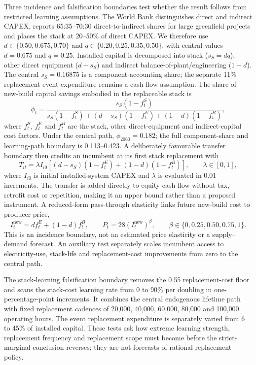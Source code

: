 \documentclass[pdflatex,sn-nature]{sn-jnl}
\begin{document}
Three incidence and falsification boundaries test whether the result follows from restricted learning assumptions. The World Bank distinguishes direct and indirect CAPEX, reports 65:35--70:30 direct-to-indirect shares for large greenfield projects and places the stack at 20--50\% of direct CAPEX\cite{worldbank2026}. We therefore use $d\in\{0.50,0.675,0.70\}$ and $q\in\{0.20,0.25,0.35,0.50\}$, with central values $d=0.675$ and $q=0.25$. Installed capital is decomposed into stack ($s_S=dq$), other direct equipment ($d-s_S$) and indirect balance-of-plant/engineering ($1-d$). The central $s_S=0.16875$ is a component-accounting share; the separate 11\% replacement-event expenditure remains a cash-flow assumption. The share of new-build capital savings embodied in the replaceable stack is
\begin{equation}
\phi_t=\frac{s_S(1-f^S_t)}{s_S(1-f^S_t)+(d-s_S)(1-f^E_t)+(1-d)(1-f^B_t)},
\label{eq:incidence}
\end{equation}
where $f^S_t$, $f^E_t$ and $f^B_t$ are the stack, other direct-equipment and indirect-capital cost factors. Under the central path, $\phi_{2060}=0.182$; the full component-share and learning-path boundary is 0.113--0.423. A deliberately favourable transfer boundary then credits an incumbent at its first stack replacement with
\begin{equation}
T_{it}=\lambda I_{i0}\left[(d-s_S)(1-f^E_t)+(1-d)(1-f^B_t)\right],
\qquad \lambda\in[0,1],
\label{eq:transfer}
\end{equation}
where $I_{i0}$ is initial installed-system CAPEX and $\lambda$ is evaluated in 0.01 increments. The transfer is added directly to equity cash flow without tax, retrofit cost or repetition, making it an upper bound rather than a proposed instrument. A reduced-form pass-through elasticity links future new-build cost to producer price,
\begin{equation}
I_t^{\mathrm{new}}=d f_t^E+(1-d)f_t^B,
\qquad P_t=28\left(I_t^{\mathrm{new}}\right)^\beta,
\qquad \beta\in\{0,0.25,0.50,0.75,1\}.
\label{eq:passthrough}
\end{equation}
This is an incidence boundary, not an estimated price elasticity or a supply--demand forecast. An auxiliary test separately scales incumbent access to electricity-use, stack-life and replacement-cost improvements from zero to the central path.

The stack-learning falsification boundary removes the 0.55 replacement-cost floor and scans the stack-cost learning rate from 0 to 90\% per doubling in one-percentage-point increments. It combines the central endogenous lifetime path with fixed replacement cadences of 20,000, 40,000, 60,000, 80,000 and 100,000 operating hours. The event replacement expenditure is separately varied from 6 to 45\% of installed capital. These tests ask how extreme learning strength, replacement frequency and replacement scope must become before the strict-marginal conclusion reverses; they are not forecasts of rational replacement policy.
\end{document}
